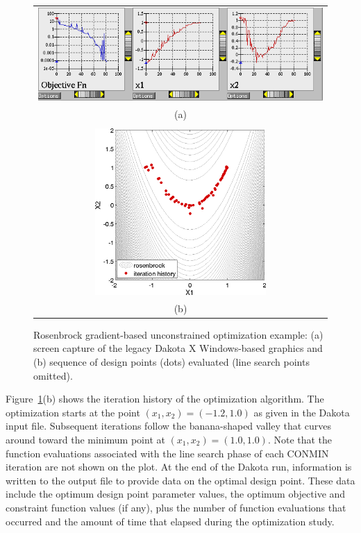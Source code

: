 \begin{figure}[ht!]
  \centering
  \begin{tabular}{c}
  \includegraphics[width=\textwidth]{images/dak_graphics_grad_opt}\\
  (a)\\
  \qquad\\
  \includegraphics[height=2.5in]{images/rosen_grad_opt_pts} \\
  (b)
  \end{tabular}
  \caption{Rosenbrock gradient-based unconstrained optimization
    example: (a) screen capture of the legacy Dakota X Windows-based
    graphics and (b) sequence of design points (dots) evaluated (line
    search points omitted).}
  \label{tutorial:rosenbrock_grad_graphics}
\end{figure}

Figure~\ref{tutorial:rosenbrock_grad_graphics}(b) shows the
iteration history of the optimization algorithm. The optimization
starts at the point $(x_1,x_2) = (-1.2,1.0)$ as given in the
Dakota input file. Subsequent iterations follow the banana-shaped
valley that curves around toward the minimum point at $(x_1,x_2) =
(1.0,1.0)$. Note that the function evaluations associated with the
line search phase of each CONMIN iteration are not shown on the plot.
At the end of the Dakota run, information is written to the output
file to provide data on the optimal design point. These data include
the optimum design point parameter values, the optimum objective and
constraint function values (if any), plus the number of function
evaluations that occurred and the amount of time that elapsed during
the optimization study.

